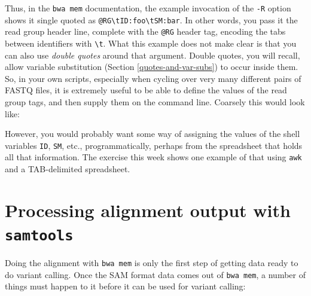 \documentclass[]{krantz}
\makeatletter
\newenvironment{Shaded}{\begin{snugshade}}{\end{snugshade}}
\newcommand{\ExtensionTok}[1]{#1}
\newcommand{\NormalTok}[1]{#1}
\newcommand{\StringTok}[1]{\textcolor[rgb]{0.5,0.5,0.5}{#1}}
\newcommand{\VariableTok}[1]{\textcolor[rgb]{0,0,0}{#1}}
\newenvironment{kframe}{%
\medskip{}
\setlength{\fboxsep}{.8em}
 \def\at@end@of@kframe{}%
 \ifinner\ifhmode%
  \def\at@end@of@kframe{\end{minipage}}%
  \begin{minipage}{\columnwidth}%
 \fi\fi%
 \def\FrameCommand##1{\hskip\@totalleftmargin \hskip-\fboxsep
 \colorbox{shadecolor}{##1}\hskip-\fboxsep
     \hskip-\linewidth \hskip-\@totalleftmargin \hskip\columnwidth}%
 \MakeFramed {\advance\hsize-\width
   \@totalleftmargin\z@ \linewidth\hsize
   \@setminipage}}%
 {\par\unskip\endMakeFramed%
 \at@end@of@kframe}
\renewenvironment{Shaded}{\begin{kframe}}{\end{kframe}}
\makeatother
\begin{document}
Thus, in the \texttt{bwa\ mem} documentation, the example invocation of the \texttt{-R} option
shows it single quoted as \texttt{\textquotesingle{}@RG\textbackslash{}tID:foo\textbackslash{}tSM:bar\textquotesingle{}}. In other words, you pass it
the read group header line, complete with the \texttt{@RG} header tag, encoding the tabs
between identifiers with \texttt{\textbackslash{}t}. What this example does not make clear is that
you can also use \emph{double quotes} around that argument. Double quotes, you will recall,
allow variable substitution (Section \ref{quotes-and-var-subs}) to occur inside them.
So, in your own scripts, especially when cycling over very many different pairs of
FASTQ files, it is extremely useful to be able to define the values of the read group
tags, and then supply them on the command line. Coarsely this would look like:

\begin{Shaded}
\end{Shaded}

However, you would probably want some way of assigning the values of the
shell variables \texttt{ID}, \texttt{SM}, etc., programmatically, perhaps from the spreadsheet
that holds all that information. The exercise this week shows one example of that
using \texttt{awk} and a TAB-delimited spreadsheet.

\hypertarget{processing-alignment-output-with-samtools}{%
\section{\texorpdfstring{Processing alignment output with \texttt{samtools}}{Processing alignment output with samtools}}\label{processing-alignment-output-with-samtools}}

Doing the alignment with \texttt{bwa\ mem} is only the first step of getting data ready to do
variant calling. Once the SAM format data comes out of \texttt{bwa\ mem}, a number of things
must happen to it before it can be used for variant calling:
\end{document}
